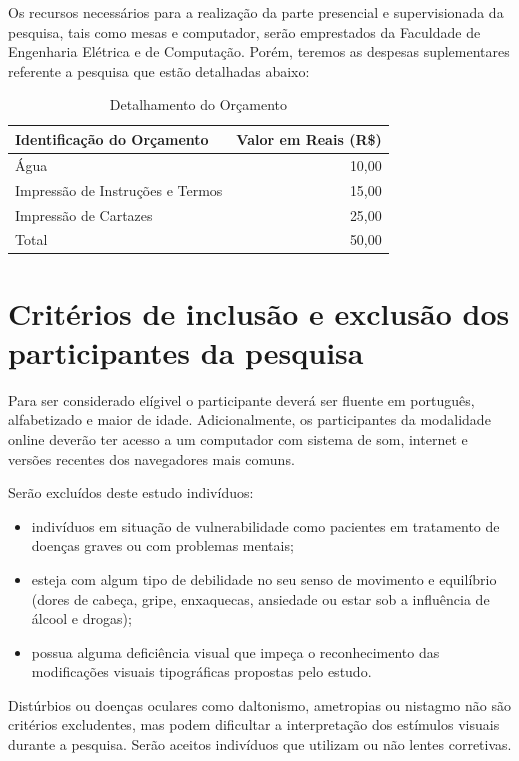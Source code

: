 \documentclass[a4paper,11pt,titlepage,singlespacing]{article}
\begin{document}
Os recursos necessários para a realização da parte presencial e supervisionada da pesquisa, tais como mesas e computador, serão emprestados da Faculdade de Engenharia Elétrica e de Computação. Porém, teremos as despesas suplementares referente a pesquisa que estão detalhadas abaixo:

\begin{table}[h]
\caption{Detalhamento do Orçamento}
\centering
\vspace{0.5cm}
\begin{tabular}{l|r}
Identificação do Orçamento & Valor em Reais (R\$) \\
\hline 
Água        & 10,00 \\
Impressão de Instruções e Termos  & 15,00 \\
Impressão de Cartazes  & 25,00 \\
\hline 
Total & 50,00
\end{tabular}
\end{table}

\section{Critérios de inclusão e exclusão dos participantes da pesquisa}

\noindent Para ser considerado elígivel o participante deverá ser fluente em português, alfabetizado e maior de idade. Adicionalmente, os participantes da modalidade online deverão ter acesso a um computador com sistema de som, internet e versões recentes dos navegadores mais comuns.

Serão excluídos deste estudo indivíduos:

\begin{itemize}
\item indivíduos em situação de vulnerabilidade como pacientes em tratamento de doenças graves ou com problemas mentais;
\item esteja com algum tipo de debilidade no seu senso de movimento e equilíbrio (dores de cabeça, gripe, enxaquecas, ansiedade ou estar sob a influência de álcool e drogas);
\item possua alguma deficiência visual que impeça o reconhecimento das modificações visuais tipográficas propostas pelo estudo.
\end{itemize}

Distúrbios ou doenças oculares como daltonismo, ametropias ou nistagmo não são critérios excludentes, mas podem dificultar a interpretação dos estímulos visuais durante a pesquisa. Serão aceitos indivíduos que utilizam ou não lentes corretivas. 
\end{document}
